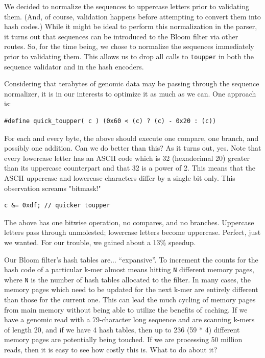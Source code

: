 \documentclass{article}
\begin{document}
We decided to normalize the sequences to uppercase letters prior to validating
them. (And, of course, validation happens before attempting to convert them
into hash codes.) While it might be ideal to perform this normalization in the
parser, it turns out that sequences can be introduced to the Bloom filter via
other routes. So, for the time being, we chose to normalize the sequences
immediately prior to validating them. This allows us to drop all calls to
\texttt{toupper} in both the sequence validator and in the hash encoders.

Considering that terabytes of genomic data may be passing through the sequence
normalizer, it is in our interests to optimize it as much as we can. One
approach is:

\begin{verbatim}
#define quick_toupper( c ) (0x60 < (c) ? (c) - 0x20 : (c))
\end{verbatim}

For each and every byte, the above should execute one compare, one branch, and
possibly one addition. Can we do better than this? As it turns out, yes. Note
that every lowercase letter has an ASCII code which is 32 (hexadecimal 20)
greater than its uppercase counterpart and that 32 is a power of 2. This means
that the ASCII uppercase and lowercase characters differ by a single bit only.
This observation screams "bitmask!"

\begin{verbatim}
c &= 0xdf; // quicker toupper
\end{verbatim}

The above has one bitwise operation, no compares, and no branches. Uppercase
letters pass through unmolested; lowercase letters become uppercase. Perfect,
just we wanted. For our trouble, we gained about a 13\% speedup.

Our Bloom filter's hash tables are... ``expansive''. To increment the counts
for the hash code of a particular k-mer almost means hitting \texttt{N}
different memory pages, where \texttt{N} is the number of hash tables allocated
to the filter. In many cases, the memory pages which need to be updated for the
next k-mer are entirely different than those for the current one. This can lead
the much cycling of memory pages from main memory without being able to utilize
the benefits of caching. If we have a genomic read with a 79-character long
sequence and are scanning k-mers of length 20, and if we have 4 hash tables,
then up to 236 (59 * 4) different memory pages are potentially being touched.
If we are processing 50 million reads, then it is easy to see how costly this
is. What to do about it?
\end{document}
